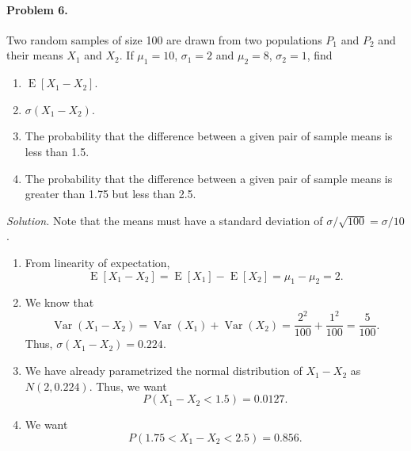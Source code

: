 \documentclass[10pt]{article}
\newcommand\var[1]{\operatorname{Var}(#1)}
\newcommand\E[1]{\operatorname{E}[#1]}
\begin{document}
        \paragraph{Problem 6.} Two random samples of size 100 are drawn from two populations $P_1$ and $P_2$ and their means $X_1$ and $X_2$.
        If $\mu_1 = 10$, $\sigma_1 = 2$ and $\mu_2 = 8$, $\sigma_2 = 1$, find
        \begin{enumerate}
                \item $\E{X_1 - X_2}$.
                \item $\sigma(X_1 - X_2)$.
                \item The probability that the difference between a given pair of sample means is less than 1.5.
                \item The probability that the difference between a given pair of sample means is greater than 1.75 but less than 2.5.
        \end{enumerate}
        \textit{Solution.} Note that the means must have a standard deviation of $\sigma /\sqrt{100} = \sigma / 10$.
        \begin{enumerate}
                \item From linearity of expectation,
                \[
                        \E{X_1 - X_2} = \E{X_1} - \E{X_2} = \mu_1 - \mu_2 = 2.
                \]
                \item We know that 
                \[
                        \var{X_1 - X_2} = \var{X_1} + \var{X_2} = \frac{2^2}{100} + \frac{1^2}{100} = \frac{5}{100}.
                \]
                Thus, $\sigma(X_1 - X_2) = 0.224$.
                \item We have already parametrized the normal distribution of $X_1 - X_2$ as $N(2, 0.224)$. Thus, we want
                \[
                        P(X_1 - X_2 < 1.5) = 0.0127.
                \]
                \item We want
                \[
                        P(1.75 < X_1 - X_2 < 2.5) = 0.856.
                \]
        \end{enumerate}
\end{document}
